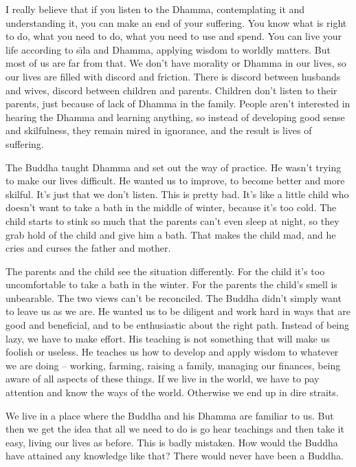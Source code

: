 I really believe that if you listen to the Dhamma, contemplating it and understanding it, you can make an end of your suffering. You know what is right to do, what you need to do, what you need to use and spend. You can live your life according to s\={\i}la and Dhamma, applying wisdom to worldly matters. But most of us are far from that. We don't have morality or Dhamma in our lives, so our lives are filled with discord and friction. There is discord between husbands and wives, discord between children and parents. Children don't listen to their parents, just because of lack of Dhamma in the family. People aren't interested in hearing the Dhamma and learning anything, so instead of developing good sense and skilfulness, they remain mired in ignorance, and the result is lives of suffering.

The Buddha taught Dhamma and set out the way of practice. He wasn't trying to make our lives difficult. He wanted us to improve, to become better and more skilful. It's just that we don't listen. This is pretty bad. It's like a little child who doesn't want to take a bath in the middle of winter, because it's too cold. The child starts to stink so much that the parents can't even sleep at night, so they grab hold of the child and give him a bath. That makes the child mad, and he cries and curses the father and mother.

The parents and the child see the situation differently. For the child it's too uncomfortable to take a bath in the winter. For the parents the child's smell is unbearable. The two views can't be reconciled. The Buddha didn't simply want to leave us as we are. He wanted us to be diligent and work hard in ways that are good and beneficial, and to be enthusiastic about the right path. Instead of being lazy, we have to make effort. His teaching is not something that will make us foolish or useless. He teaches us how to develop and apply wisdom to whatever we are doing -- working, farming, raising a family, managing our finances, being aware of all aspects of these things. If we live in the world, we have to pay attention and know the ways of the world. Otherwise we end up in dire straits.

We live in a place where the Buddha and his Dhamma are familiar to us. But then we get the idea that all we need to do is go hear teachings and then take it easy, living our lives as before. This is badly mistaken. How would the Buddha have attained any knowledge like that? There would never have been a Buddha.

